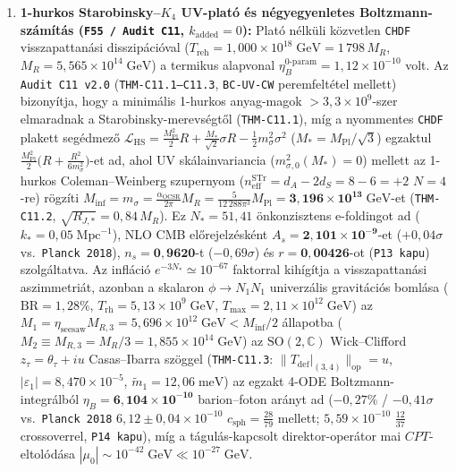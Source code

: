 \documentclass[11pt,a4paper]{article}
\begin{document}
\begin{enumerate}[label=(\arabic*),leftmargin=1.8em,itemsep=2pt]
\item \textbf{1-hurkos Starobinsky--$K_4$ UV-plató és négyegyenletes Boltzmann-számítás (\texttt{F55 / Audit C11}, $k_{\mathrm{added}}=0$):} Plató nélküli közvetlen \texttt{CHDF} visszapattanási disszipációval ($T_{\mathrm{reh}} = 1{,}000\times 10^{18}\;\mathrm{GeV} = 1\,798\,M_R$, $M_R = 5{,}565\times 10^{14}\;\mathrm{GeV}$) a termikus alapvonal $\eta_B^{\mathrm{0\text{-}param}} = 1{,}12\times 10^{-10}$ volt. Az \texttt{Audit C11 v2.0} (\texttt{THM-C11.1--C11.3}, \texttt{BC-UV-CW} peremfelt\'etel mellett) bizony\'itja, hogy a minim\'alis 1-hurkos anyag-magok $>3{,}3\times 10^9$-szer elmaradnak a Starobinsky-merevs\'egt\H{o}l (\texttt{THM-C11.1}), m\'ig a nyommentes \texttt{CHDF} plakett seg\'edmez\H{o} $\mathcal{L}_{\mathrm{HS}} = \frac{M_{\mathrm{Pl}}^2}{2}R + \frac{M_*}{\sqrt{2}}\sigma R - \frac{1}{2}m_\sigma^2\sigma^2$ ($M_* = M_{\mathrm{Pl}}/\sqrt{3}$) egzaktul $\frac{M_{\mathrm{Pl}}^2}{2}\bigl(R + \frac{R^2}{6m_\sigma^2}\bigr)$-et ad, ahol UV sk\'alainvariancia ($m_{\sigma,0}^2(M_*)=0$) mellett az 1-hurkos Coleman--Weinberg szupernyom ($n_{\mathrm{eff}}^{\mathrm{STr}} = d_A - 2d_S = 8 - 6 = +2$ $N=4$-re) r\"ogz\'iti $M_{\mathrm{inf}} = m_\sigma = \frac{\alpha_{\mathrm{OCSR}}}{2\pi}M_R = \frac{5}{12\,288\pi^3}M_{\mathrm{Pl}} = \mathbf{3{,}196\times 10^{13}\;\mathrm{GeV}}$-et (\texttt{THM-C11.2}, $\sqrt{R_{J,*}} = 0{,}84\,M_R$). Ez $N_* = 51{,}41$ önkonzisztens e-foldingot ad ($k_* = 0{,}05\;\mathrm{Mpc}^{-1}$), NLO CMB előrejelzésként $A_s = \mathbf{2{,}101\times 10^{-9}}$-et ($+0{,}04\sigma$ vs.\ \texttt{Planck 2018}), $n_s = \mathbf{0{,}9620}$-t ($-0{,}69\sigma$) és $r = \mathbf{0{,}00426}$-ot (\texttt{P13 kapu}) szolgáltatva. Az infláció $e^{-3N_*} \simeq 10^{-67}$ faktorral kihígítja a visszapattanási aszimmetriát, azonban a skalaron $\phi \to N_1 N_1$ univerzális gravitációs bomlása ($\mathrm{BR} = 1{,}28\%$, $T_{\mathrm{rh}} = 5{,}13\times 10^9\;\mathrm{GeV}$, $T_{\max} = 2{,}11\times 10^{12}\;\mathrm{GeV}$) az $M_1 = \eta_{\mathrm{seesaw}}M_{R,3} = 5{,}696\times 10^{12}\;\mathrm{GeV} < M_{\mathrm{inf}}/2$ állapotba ($M_2 \equiv M_{R,3} = M_R/3 = 1{,}855\times 10^{14}\;\mathrm{GeV}$) az $\mathrm{SO}(2,\mathbb{C})$ Wick--Clifford $z_\tau = \theta_\tau + i u$ Casas--Ibarra szöggel (\texttt{THM-C11.3}: $\|T_{\mathrm{def}}|_{(3,4)}\|_{\mathrm{op}} = u$, $|\varepsilon_1| = 8{,}470\times 10^{-5}$, $\tilde{m}_1 = 12{,}06\;\mathrm{meV}$) az egzakt 4-ODE Boltzmann-integrálból $\eta_B = \mathbf{6{,}104\times 10^{-10}}$ barion--foton arányt ad ($-0{,}27\%$ / $-0{,}41\sigma$ vs.\ \texttt{Planck 2018} $6{,}12 \pm 0{,}04\times 10^{-10}$ $c_{\mathrm{sph}} = \frac{28}{79}$ mellett; $5{,}59\times 10^{-10}$ $\frac{12}{37}$ crossoverrel, \texttt{P14 kapu}), míg a tágulás-kapcsolt direktor-operátor mai $CPT$-eltolódása $|\mu_0| \sim 10^{-42}\;\mathrm{GeV} \ll 10^{-27}\;\mathrm{GeV}$.

\end{enumerate}
\end{document}
